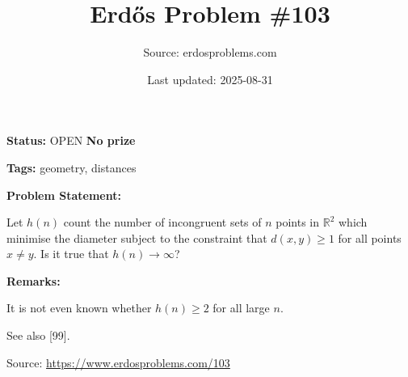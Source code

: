 \documentclass{article}
\title{Erd\H{o}s Problem \#103}
\date{Last updated: 2025-08-31}
\author{Source: erdosproblems.com}
\begin{document}
\maketitle

\noindent\textbf{Status:} OPEN \quad \textbf{No prize}

\noindent\textbf{Tags:} geometry, distances

\medskip
\noindent\textbf{Problem Statement:}

Let $h(n)$ count the number of incongruent sets of $n$ points in $\mathbb{R}^2$ which minimise the diameter subject to the constraint that $d(x,y)\geq 1$ for all points $x\neq y$. Is it true that $h(n)\to \infty$?

\bigskip
\noindent\textbf{Remarks:}

It is not even known whether $h(n)\geq 2$ for all large $n$.

See also [99].

\bigskip
\noindent\small{Source: \url{https://www.erdosproblems.com/103}}
\end{document}
